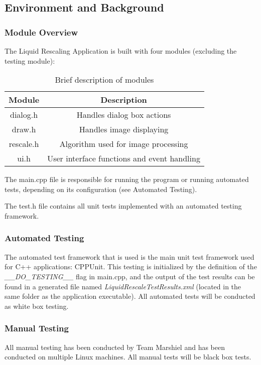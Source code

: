 \documentclass{article}
\begin{document}
\subsection{Environment and Background}
\subsubsection{Module Overview}
The Liquid Rescaling Application is built with four modules (excluding the testing module): 

\begin{table}[h!]
    \caption{Brief description of modules}
    \label{tab:mod_desc}
    \centering
    \begin{tabular}{|c|c|}
        \hline
        \textbf{Module} & \textbf{Description} \\
        \hline
        dialog.h & Handles dialog box actions \\
        \hline
        draw.h & Handles image displaying \\
        \hline
        rescale.h & Algorithm used for image processing \\
        \hline
        ui.h & User interface functions and event handling \\
        \hline
    \end{tabular}
    
\end{table}

The main.cpp file is responsible for running the program or running automated tests, depending on its configuration (see Automated Testing).

The test.h file contains all unit tests implemented with an automated testing framework.

\subsubsection{Automated Testing}
The automated test framework that is used is the main unit test framework used for C++ applications: CPPUnit. This testing is initialized by the definition of the \textit{\_\_DO\_TESTING\_\_} flag in main.cpp, and the output of the test results can be found in a generated file named \textit{LiquidRescaleTestResults.xml} (located in the same folder as the application executable). All automated tests will be conducted as white box testing. \\

\subsubsection{Manual Testing}
All manual testing has been conducted by Team Marshiel and has been conducted on multiple Linux machines. All manual tests will be black box tests. \\
\end{document}
